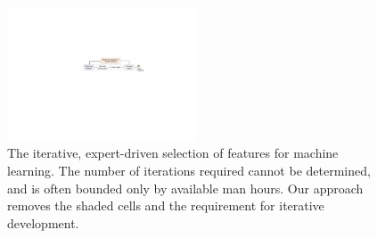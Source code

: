 \begin{figure}
	\centering
	\includegraphics[width=0.5\textwidth]{img/feature_selection2} %
	\vspace{-.5em}%
	\caption{%
		The iterative, expert-driven selection of features for machine learning. The number of iterations required cannot be determined, and is often bounded only by available man hours. Our approach removes the shaded cells and the requirement for iterative development.
	}%
	\label{fig:iterative-feature-design}
\end{figure}
